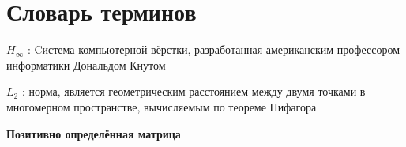 \chapter*{Словарь терминов}             %

\textbf{\(H_\infty\)} : Cистема компьютерной вёрстки, разработанная американским профессором информатики Дональдом Кнутом

\textbf{\(L_2\)} : норма, является геометрическим расстоянием между двумя точками в многомерном пространстве, вычисляемым по теореме Пифагора

\textbf{Позитивно определённая матрица}
